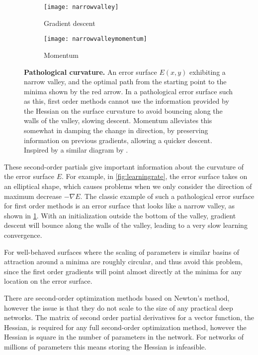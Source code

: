 \documentclass[thesis]{subfiles}
\begin{document}
\begin{figure}[tbp]
\centering
\begin{subfigure}[b]{0.45\textwidth}
\texttt{[image: narrowvalley]}
\caption{Gradient descent}\label{fig:narrowvalleysgd}
\end{subfigure}
\begin{subfigure}[b]{0.45\textwidth}
\texttt{[image: narrowvalleymomentum]}
\caption{Momentum}\label{fig:narrowvalleymomentum}
\end{subfigure}
\caption[Pathological curvature.]{\textbf{Pathological curvature.} An error surface $E(x, y)$ exhibiting a narrow valley, and the optimal path from the starting point to the minima shown by the red arrow. In a pathological error surface such as this, first order methods cannot use the information provided by the Hessian on the surface curvature to avoid bouncing along the walls of the valley, slowing descent. Momentum alleviates this somewhat in damping the change in direction, by preserving information on previous gradients, allowing a quicker descent. Inspired by a similar diagram by \citet{martens2010deep}.}
\label{fig:pathological}
\end{figure}
These second-order partials give important information about the curvature of the error surface $E$. For example, in \cref{fig:learningrate}, the error surface takes on an elliptical shape, which causes problems when we only consider the direction of maximum decrease $-\nabla E$. The classic example of such a pathological error surface for first order methods is an error surface that looks like a narrow valley, as shown in \cref{fig:narrowvalleysgd}. With an initialization outside the bottom of the valley, gradient descent will bounce along the walls of the valley, leading to a very slow learning convergence.

For well-behaved surfaces where the scaling of parameters is similar
basins of attraction around a minima are roughly circular, and thus avoid this problem, since the first order gradients will point almost directly at the minima for any location on the error surface.

There are second-order optimization methods based on Newton's method, however the issue is that they do not scale to the size of any practical deep networks. The matrix of second order partial derivatives for a vector function, the Hessian, is required for any full second-order optimization method, however the Hessian is square in the number of parameters in the network. For networks of millions of parameters this means storing the Hessian is infeasible.
\end{document}
